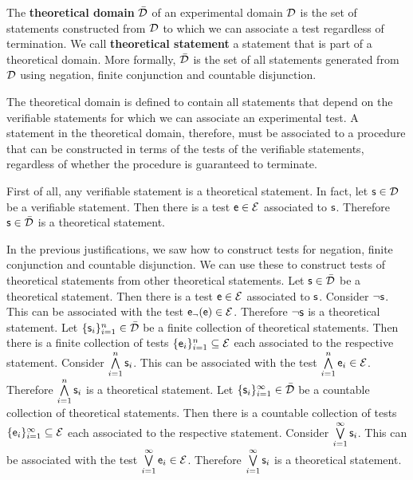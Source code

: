 	\begin{mathSection}
		\begin{defn}\label{pm-vs-defTheoreticalDomain}
			The \textbf{theoretical domain} $\bar{\mathcal{D}}$ of an experimental domain $\mathcal{D}$ is the set of statements constructed from $\mathcal{D}$ to which we can associate a test regardless of termination. We call \textbf{theoretical statement} a statement that is part of a theoretical domain. More formally, $\bar{\mathcal{D}}$ is the set of all statements generated from $\mathcal{D}$ using negation, finite conjunction and countable disjunction.
		\end{defn}
		\begin{justification}
			The theoretical domain is defined to contain all statements that depend on the verifiable statements for which we can associate an experimental test. A statement in the theoretical domain, therefore, must be associated to a procedure that can be constructed in terms of the tests of the verifiable statements, regardless of whether the procedure is guaranteed to terminate.
			
			First of all, any verifiable statement is a theoretical statement. In fact, let $\mathsf{s} \in \mathcal{D}$ be a verifiable statement. Then there is a test $\mathsf{e} \in \mathcal{E}$ associated to $\mathsf{s}$. Therefore $\mathsf{s} \in \bar{\mathcal{D}}$ is a theoretical statement.
			
			In the previous justifications, we saw how to construct tests for negation, finite conjunction and countable disjunction. We can use these to construct tests of theoretical statements from other theoretical statements. Let $\mathsf{s} \in \bar{\mathcal{D}}$ be a theoretical statement. Then there is a test $\mathsf{e} \in \mathcal{E}$ associated to $\mathsf{s}$. Consider $\neg\mathsf{s}$. This can be associated with the test $\mathsf{e}_\neg(\mathsf{e}) \in \mathcal{E}$. Therefore $\neg\mathsf{s}$ is a theoretical statement. Let $\{\mathsf{s}_i\}_{i=1}^{n} \in \bar{\mathcal{D}}$ be a finite collection of theoretical statements. Then there is a finite collection of tests $\{\mathsf{e}_i\}_{i=1}^{n} \subseteq \mathcal{E}$ each associated to the respective statement. Consider $\bigwedge\limits_{i=1}^{n} \mathsf{s}_i$. This can be associated with the test $\bigwedge\limits_{i=1}^{n} \mathsf{e}_i \in \mathcal{E}$. Therefore $\bigwedge\limits_{i=1}^{n} \mathsf{s}_i$ is a theoretical statement. Let $\{\mathsf{s}_i\}_{i=1}^{\infty} \in \bar{\mathcal{D}}$ be a countable collection of theoretical statements. Then there is a countable collection of tests $\{\mathsf{e}_i\}_{i=1}^{\infty} \subseteq \mathcal{E}$ each associated to the respective statement. Consider $\bigvee\limits_{i=1}^{\infty} \mathsf{s}_i$. This can be associated with the test $\bigvee\limits_{i=1}^{\infty} \mathsf{e}_i \in \mathcal{E}$. Therefore $\bigvee\limits_{i=1}^{\infty} \mathsf{s}_i$ is a theoretical statement.
			

\end{justification}
\end{mathSection}
